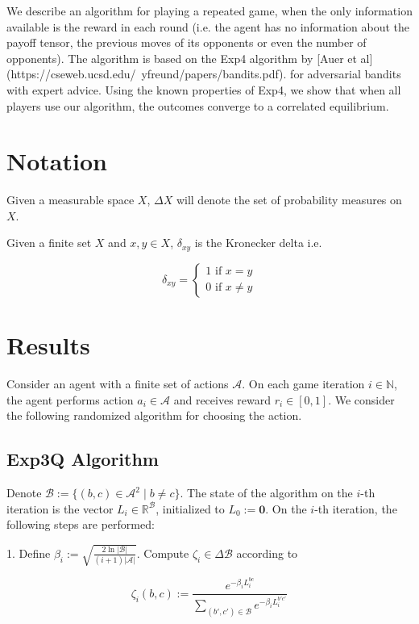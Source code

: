 \documentclass[a4paper]{article}
\newcommand{\Nats}{\mathbb{N}}
\newcommand{\Reals}{\mathbb{R}}
\newcommand{\Abs}[1]{\lvert #1 \rvert}
\newcommand{\Act}{\mathcal{A}}
\newcommand{\ActCh}{\mathcal{B}}
\begin{document}
We describe an algorithm for playing a repeated game, when the only information available is the reward in each round (i.e. the agent has no information about the payoff tensor, the previous moves of its opponents or even the number of opponents). The algorithm is based on the Exp4 algorithm by [Auer et al](https://cseweb.ucsd.edu/~yfreund/papers/bandits.pdf). for adversarial bandits with expert advice. Using the known properties of Exp4, we show that when all players use our algorithm, the outcomes converge to a correlated equilibrium.

\section{Notation}

Given a measurable space ${X}$, ${\Delta X}$ will denote the set of probability measures on ${X}$.

Given a finite set ${X}$ and ${x,y \in X}$, ${\delta_{xy}}$ is the Kronecker delta i.e.

$$\delta_{xy}=\begin{cases}1 \text{ if } x=y\\0 \text{ if } x \ne y\end{cases}$$

\section{Results}

Consider an agent with a finite set of actions ${\Act}$. On each game iteration ${i \in \Nats}$, the agent performs action ${a_i \in \Act}$ and receives reward ${r_i \in [0,1]}$. We consider the following randomized algorithm for choosing the action.

\subsection{Exp3Q Algorithm}

Denote ${\ActCh:=\{(b,c) \in \Act^2 \mid b \ne c\}}$. The state of the algorithm on the ${i}$-th iteration is the vector ${L_i \in \Reals^\mathcal{B}}$, initialized to ${L_0 := \bm{0}}$. On the ${i}$-th iteration, the following steps are performed:

1. Define ${\beta_i:=\sqrt{\frac{2 \ln \Abs{\ActCh}}{(i+1) \Abs{\Act}}}}$. Compute ${\zeta_i \in \Delta\mathcal{B}}$ according to 

$$\zeta_i(b,c):=\frac{e^{-\beta_i L_i^{bc}}}{\sum_{(b',c') \in \ActCh} e^{-\beta_i L_i^{b'c'}}}$$
\end{document}
